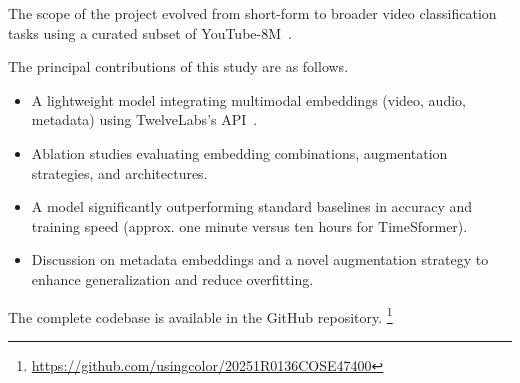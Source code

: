 The scope of the project evolved from short-form to broader video classification tasks using a curated subset of YouTube-8M~\cite{abu2016youtube}.

The principal contributions of this study are as follows. 



\begin{itemize}
\item A lightweight model integrating multimodal embeddings (video, audio, metadata) using TwelveLabs's API~\cite{twelvelabs_embed_api_doc}.
\item Ablation studies evaluating embedding combinations, augmentation strategies, and architectures.
\item A model significantly outperforming standard baselines in accuracy and training speed (approx. one minute versus ten hours for TimeSformer).
\item Discussion on metadata embeddings and a novel augmentation strategy to enhance generalization and reduce overfitting.
\end{itemize}
\noindent The complete codebase is available in the GitHub repository. 
\footnote{\url{https://github.com/usingcolor/20251R0136COSE47400}}
